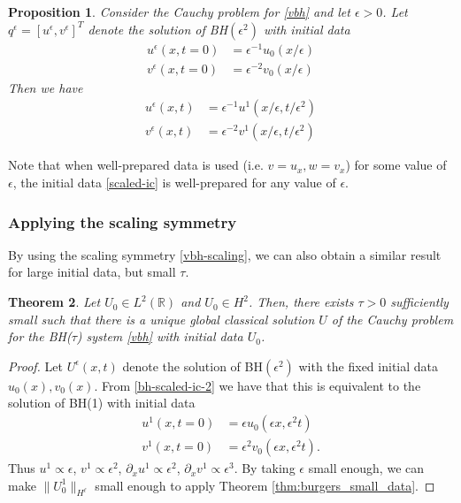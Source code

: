\documentclass{article}
\theoremstyle{plain}
\newtheorem{theorem}{Theorem}
\newtheorem{proposition}[theorem]{Proposition}
\theoremstyle{definition}
\numberwithin{theorem}{section}
\begin{document}
\begin{proposition}\label{prop:vbh-scaling}
Consider the Cauchy problem for \eqref{vbh} and let $\epsilon>0$.
Let $q^\epsilon=[u^\epsilon,v^\epsilon]^T$ denote the
solution of BH$(\epsilon^2)$ with initial data
\begin{subequations} \label{bh-scaled-ic}
\begin{align}
    u^\epsilon(x,t=0) & = \epsilon^{-1} u_0(x/\epsilon) \\
    v^\epsilon(x,t=0) & = \epsilon^{-2} v_0(x/\epsilon)
\end{align}
\end{subequations}
Then we have
\begin{subequations} \label{bh-scaled-ic-2}
\begin{align}
    u^{\epsilon}(x,t) & = \epsilon^{-1} u^1(x/\epsilon, t/\epsilon^2) \\
    v^{\epsilon}(x,t) & = \epsilon^{-2} v^1(x/\epsilon, t/\epsilon^2)
\end{align}
\end{subequations}
\end{proposition}
Note that when well-prepared data is used (i.e. $v=u_x, w = v_x$) for some value of
$\epsilon$, the initial data \eqref{scaled-ic} is well-prepared for any value of $\epsilon$.


\subsubsection{Applying the scaling symmetry}
By using the scaling symmetry \eqref{vbh-scaling}, we can also obtain a similar result for large initial data, but small $\tau$.
\begin{theorem}
\label{thm:bh_small_tau}
    Let
    $U_0 \in L^2(\mathbb{R})$ and
    $U_0 \in H^2$.
    Then, there exists $\tau > 0$ sufficiently small such that
    there is a unique global classical solution $U$ of the Cauchy problem for the BH($\tau$) system \eqref{vbh}
    with initial data $U_0$.
\end{theorem}
\begin{proof}
    Let $U^\epsilon(x,t)$ denote the solution of
    BH$(\epsilon^2)$ with the fixed initial data $u_0(x),v_0(x)$.  From \eqref{bh-scaled-ic-2}
    we have that this is equivalent to the solution of BH(1) with initial data
    \begin{align*}
        u^1(x,t=0) & = \epsilon u_0(\epsilon x, \epsilon^2 t) \\
        v^1(x,t=0) & = \epsilon^2 v_0(\epsilon x, \epsilon^2 t).
    \end{align*}
    Thus $u^1 \propto \epsilon$, $v^1\propto \epsilon^2$, $\partial_x u^1 \propto \epsilon^2$,
    $\partial_x v^1 \propto \epsilon^3$.  By taking $\epsilon$ small enough, 
    we can make $\|U^1_0\|_{H^\ell}$ small enough to apply Theorem \ref{thm:burgers_small_data}.
\end{proof}
\end{document}
